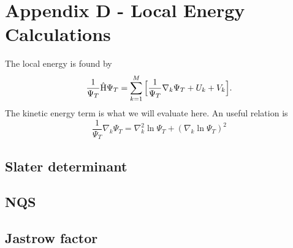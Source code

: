 \section{Appendix D - Local Energy Calculations}
The local energy is found by 
\begin{equation}
\frac{1}{\Psi_T}\hat{\text{H}}\Psi_T=\sum_{k=1}^M\Big[\frac{1}{\Psi_T}\nabla_k\Psi_T + U_k + V_k\Big].
\end{equation}
The kinetic energy term is what we will evaluate here. An useful relation is
\begin{equation}
\frac{1}{\Psi_T}\nabla_k\Psi_T=\nabla_k^2\ln\Psi_T + (\nabla_k\ln\Psi_T)^2
\end{equation}

\subsection{Slater determinant}

\subsection{NQS}

\subsection{Jastrow factor}